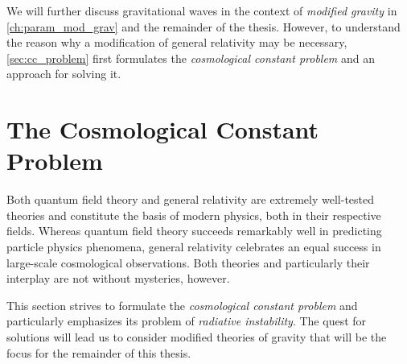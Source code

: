 \documentclass[parskip=half]{scrreprt}
\begin{document}




We will further discuss gravitational waves in the context of \emph{modified gravity} in \autoref{ch:param_mod_grav} and the remainder of the thesis. However, to understand the reason why a modification of general relativity may be necessary, \autoref{sec:cc_problem} first formulates the \emph{cosmological constant problem} and an approach for solving it.

\section{The Cosmological Constant Problem}\label{sec:cc_problem}

Both quantum field theory and general relativity are extremely well-tested theories and constitute the basis of modern physics, both in their respective fields. Whereas quantum field theory succeeds remarkably well in predicting particle physics phenomena, general relativity celebrates an equal success in large-scale cosmological observations. Both theories and particularly their interplay are not without mysteries, however.

This section strives to formulate the \emph{cosmological constant problem} and particularly emphasizes its problem of \emph{radiative instability}. The quest for solutions will lead us to consider modified theories of gravity that will be the focus for the remainder of this thesis.
\end{document}
